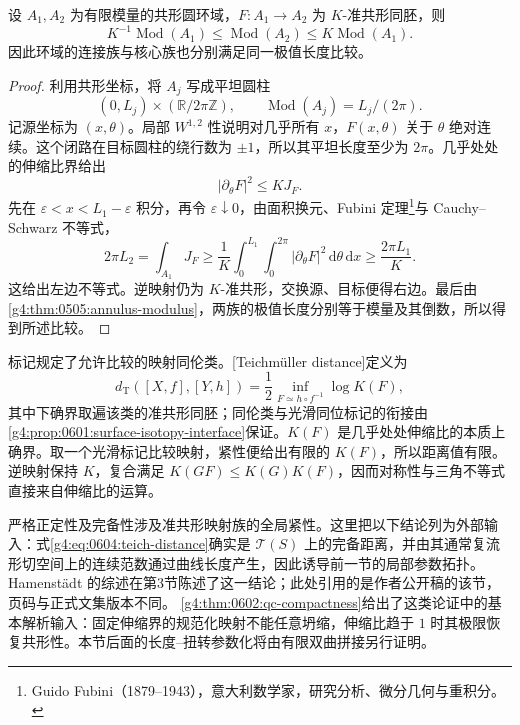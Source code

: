 \begin{proposition}
	\label{g4:prop:0604:annulus-qc}
	设 \(A_1,A_2\) 为有限模量的共形圆环域，\(F:A_1\to A_2\) 为 \(K\)-准共形同胚，则
	\[
		K^{-1}\operatorname{Mod}(A_1)
		\le\operatorname{Mod}(A_2)
		\le K\operatorname{Mod}(A_1).
	\]
	因此环域的连接族与核心族也分别满足同一极值长度比较。
\end{proposition}
\begin{proof}
	利用共形坐标，将 \(A_j\) 写成平坦圆柱
	\[
		(0,L_j)\times(\mathbb R/2\pi\mathbb Z),
		\qquad \operatorname{Mod}(A_j)=L_j/(2\pi).
	\]
	记源坐标为 \((x,\theta)\)。局部 \(W^{1,2}\) 性说明对几乎所有 \(x\)，\(F(x,\theta)\) 关于 \(\theta\) 绝对连续。这个闭路在目标圆柱的绕行数为 \(\pm1\)，所以其平坦长度至少为 \(2\pi\)。几乎处处的伸缩比界给出
	\[
		|\partial_\theta F|^2\le KJ_F.
	\]
	先在 \(\varepsilon<x<L_1-\varepsilon\) 积分，再令 \(\varepsilon\downarrow0\)，由面积换元、Fubini 定理\footnote{Guido Fubini（1879--1943），意大利数学家，研究分析、微分几何与重积分。}与 Cauchy--Schwarz 不等式，
	\[
		2\pi L_2=\int_{A_1}J_F
		\ge\frac1K\int_0^{L_1}\int_0^{2\pi}|\partial_\theta F|^2
		\,\mathrm{d}\theta\,\mathrm{d}x
		\ge\frac{2\pi L_1}{K}.
	\]
	这给出左边不等式。逆映射仍为 \(K\)-准共形，交换源、目标便得右边。最后由\cref{g4:thm:0505:annulus-modulus}，两族的极值长度分别等于模量及其倒数，所以得到所述比较。
\end{proof}

标记规定了允许比较的映射同伦类。[Teichmüller distance]定义为
\begin{equation}
	\label{g4:eq:0604:teich-distance}
	d_{\mathrm T}([X,f],[Y,h])
	=\frac12\inf_{F\simeq h\circ f^{-1}}\log K(F),
\end{equation}
其中下确界取遍该类的准共形同胚；同伦类与光滑同位标记的衔接由\cref{g4:prop:0601:surface-isotopy-interface}保证。\(K(F)\) 是几乎处处伸缩比的本质上确界。取一个光滑标记比较映射，紧性便给出有限的 \(K(F)\)，所以距离值有限。逆映射保持 \(K\)，复合满足 \(K(GF)\le K(G)K(F)\)，因而对称性与三角不等式直接来自伸缩比的运算。

\ProseParagraphBreak

严格正定性及完备性涉及准共形映射族的全局紧性。这里把以下结论列为外部输入：式\eqref{g4:eq:0604:teich-distance}确实是 \(\mathcal T(S)\) 上的完备距离，并由其通常复流形切空间上的连续范数通过曲线长度产生，因此诱导前一节的局部参数拓扑。Hamenstädt 的综述在第3节陈述了这一结论；此处引用的是作者公开稿的该节，页码与正式文集版本不同。\cite[作者公开稿第3节，第234--235页]{Hamenstadt2006Mapping}
\cref{g4:thm:0602:qc-compactness}给出了这类论证中的基本解析输入：固定伸缩界的规范化映射不能任意坍缩，伸缩比趋于 \(1\) 时其极限恢复共形性。本节后面的长度--扭转参数化将由有限双曲拼接另行证明。

